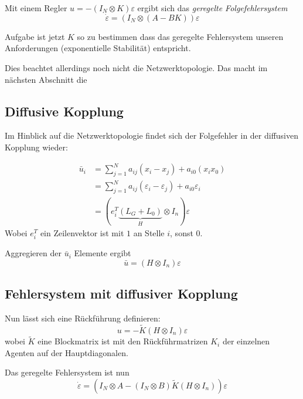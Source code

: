 Mit einem Regler $u=-(I_N \otimes K)\varepsilon$  ergibt sich das
\emph{geregelte Folgefehlersystem}
\begin{equation}
    \dot{\varepsilon} = (I_N \otimes (A-BK))\varepsilon
\end{equation}

Aufgabe ist jetzt $K$ so zu bestimmen dass das geregelte Fehlersystem unseren
Anforderungen (exponentielle Stabilität) entspricht.

Dies beachtet allerdings noch nicht die Netzwerktopologie.
Das macht im nächsten Abschnitt die

\subsection{Diffusive Kopplung}
Im Hinblick auf die Netzwerktopologie findet sich der Folgefehler in der
diffusiven Kopplung wieder:

\begin{align}
    \bar{u}_i &= \sum_{j=1}^N a_{ij} (x_i-x_j) + a_{i0}(x_ix_0) \\
    &= \sum_{j=1}^N a_{ij} (\varepsilon_i - \varepsilon_j) + a_{i0} \varepsilon_i \\
    &= \left(e_i^T\underbrace{(L_G+L_0)}_H \otimes I_n\right)\varepsilon
\end{align}
Wobei $e_i^T$ ein Zeilenvektor ist mit $1$ an Stelle $i$, sonst $0$.

Aggregieren der $\bar{u}_i$ Elemente ergibt
\begin{equation}
    \bar{u} = (H \otimes I_n)\varepsilon
\end{equation}

\subsection{Fehlersystem mit diffusiver Kopplung}
Nun lässt sich eine Rückführung definieren:
\begin{equation}
    u=-\tilde{K}(H\otimes I_n)\varepsilon
\end{equation}
wobei $\tilde{K}$ eine Blockmatrix ist mit den Rückführmatrizen $K_i$ der einzelnen
Agenten auf der Hauptdiagonalen.

Das geregelte Fehlersystem ist nun
\begin{equation}
    \dot{\varepsilon} = (I_N \otimes A - (I_N \otimes B) \tilde{K}(H \otimes I_n))\varepsilon
    \label{eqn:fehlersystem_geregelt_ktilde}
\end{equation}

